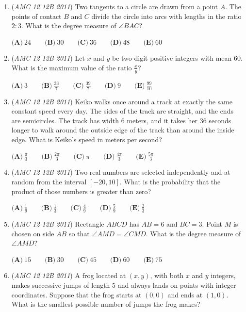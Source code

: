 \begin{enumerate}
	\item (\textit{AMC 12 12B 2011}) Two tangents to a circle are drawn from a point $A$.  The points of contact $B$ and $C$ divide the circle into arcs with lengths in the ratio $2 : 3$.  What is the degree measure of $\angle{BAC}$?


 $\textbf{(A)}\ 24 \qquad \textbf{(B)}\ 30 \qquad \textbf{(C)}\ 36 \qquad \textbf{(D)}\ 48 \qquad \textbf{(E)}\ 60$


	\item (\textit{AMC 12 12B 2011}) Let $x$ and $y$ be two-digit positive integers with mean $60$.  What is the maximum value of the ratio $\frac{x}{y}$?


 $\textbf{(A)}\ 3 \qquad \textbf{(B)}\ \frac{33}{7} \qquad \textbf{(C)}\ \frac{39}{7} \qquad \textbf{(D)}\ 9 \qquad \textbf{(E)}\ \frac{99}{10}$


	\item (\textit{AMC 12 12B 2011}) Keiko walks once around a track at exactly the same constant speed every day. The sides of the track are straight, and the ends are semicircles. The track has width $6$ meters, and it takes her $36$ seconds longer to walk around the outside edge of the track than around the inside edge. What is Keiko's speed in meters per second?


 $\textbf{(A)}\ \frac{\pi}{3} \qquad \textbf{(B)}\ \frac{2\pi}{3} \qquad \textbf{(C)}\ \pi \qquad \textbf{(D)}\ \frac{4\pi}{3} \qquad \textbf{(E)}\ \frac{5\pi}{3}$


	\item (\textit{AMC 12 12B 2011}) Two real numbers are selected independently and at random from the interval $[-20,10]$.  What is the probability that the product of those numbers is greater than zero?


 $\textbf{(A)}\ \frac{1}{9} \qquad \textbf{(B)}\ \frac{1}{3} \qquad \textbf{(C)}\ \frac{4}{9} \qquad \textbf{(D)}\ \frac{5}{9} \qquad \textbf{(E)}\ \frac{2}{3}$


	\item (\textit{AMC 12 12B 2011}) Rectangle $ABCD$ has $AB=6$ and $BC=3$. Point $M$ is chosen on side $AB$ so that $\angle AMD=\angle CMD$. What is the degree measure of $\angle AMD$?


 $\textbf{(A)}\ 15 \qquad \textbf{(B)}\ 30 \qquad \textbf{(C)}\ 45 \qquad \textbf{(D)}\ 60 \qquad \textbf{(E)}\ 75$


	\item (\textit{AMC 12 12B 2011}) A frog located at $(x,y)$, with both $x$ and $y$ integers, makes successive jumps of length $5$ and always lands on points with integer coordinates. Suppose that the frog starts at $(0,0)$ and ends at $(1,0)$. What is the smallest possible number of jumps the frog makes?



\end{enumerate}
